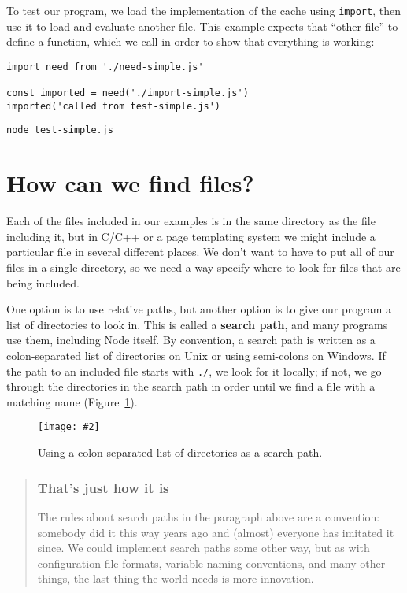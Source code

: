 \documentclass[krantzl]{krantz}
\newcommand{\figpdf}[4]{\begin{figure}%
\centering%
\texttt{[image: \#2]}%
\caption{#3}%
\label{#1}%
\end{figure}}
\newcommand{\figref}[1]{Figure~\ref{#1}}
\newcommand{\glossref}[1]{\textbf{#1}}
\newenvironment{callout}{\savenotes\begin{tBox}\begin{quotation}\toggletrue{inbox}\renewcommand{\thempfootnote}{\arabic{footnote}}}{\end{quotation}\vspace{\baselineskip}\end{tBox}\togglefalse{inbox}\spewnotes}
\begin{document}
To test our program,
we load the implementation of the cache using \texttt{import},
then use it to load and evaluate another file.
This example expects that “other file” to define a function,
which we call in order to show that everything is working:


\begin{lstlisting}[frame=tblr]
import need from './need-simple.js'

const imported = need('./import-simple.js')
imported('called from test-simple.js')
\end{lstlisting}



\begin{lstlisting}[frame=shadowbox]
node test-simple.js
\end{lstlisting}


\section{How can we find files?}\label{file-interpolator-find}


Each of the files included in our examples is in the same directory as the file including it,
but in C/C++ or a page templating system
we might include a particular file in several different places.
We don’t want to have to put all of our files in a single directory,
so we need a way specify where to look for files that are being included.


One option is to use relative paths,
but another option is to give our program
a list of directories to look in.
This is called a \glossref{search path},
and many programs use them,
including Node itself.
By convention,
a search path is written as a colon-separated list of directories on Unix
or using semi-colons on Windows.
If the path to an included file starts with \texttt{./},
we look for it locally;
if not,
we go through the directories in the search path in order
until we find a file with a matching name
(\figref{file-interpolator-search-path}).

\figpdf{file-interpolator-search-path}{./file-interpolator/search-path.pdf}{Using a colon-separated list of directories as a search path.}{0.6}

\begin{callout}


\subsubsection*{That’s just how it is}


The rules about search paths in the paragraph above are a convention:
somebody did it this way years ago
and (almost) everyone has imitated it since.
We could implement search paths some other way,
but as with configuration file formats,
variable naming conventions,
and many other things,
the last thing the world needs is more innovation.

\end{callout}
\end{document}

